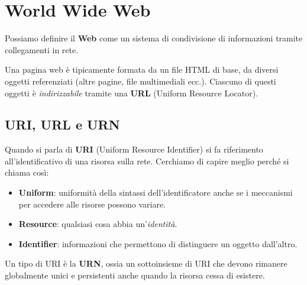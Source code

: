 \section{World Wide Web}
Possiamo definire il \textbf{Web} come un sistema di condivisione di 
informazioni tramite collegamenti in rete.

Una pagina web è tipicamente formata da un file HTML di base, da 
diversi oggetti referenziati (altre pagine, file multimediali ecc.).
Ciascuno di questi oggetti è \emph{indirizzabile} tramite una 
\textbf{URL} (Uniform Resource Locator).

\subsection{URI, URL e URN}
Quando si parla di \textbf{URI} (Uniform Resource Identifier) si fa 
riferimento all'identificativo di una risorsa sulla rete. Cerchiamo 
di capire meglio perché si chiama così:
\begin{itemize}
	\item \textbf{Uniform}: uniformità della sintassi 
		dell'identificatore anche se i meccanismi per accedere alle 
		risorse possono variare.
	\item \textbf{Resource}: qualsiasi cosa abbia un'\emph{identità}.
	\item \textbf{Identifier}: informazioni che permettono di 
		distinguere un oggetto dall'altro.
\end{itemize}
Un tipo di URI è la \textbf{URN}, ossia un sottoinsieme di URI che 
devono rimanere globalmente unici e persistenti anche quando la 
risorsa cessa di esistere.

